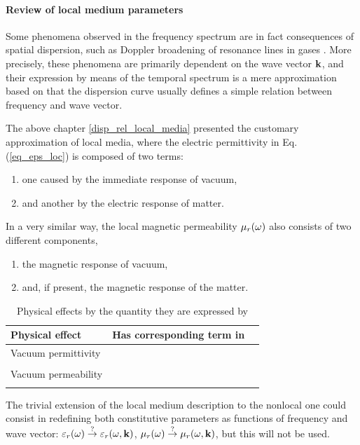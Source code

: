 \paragraph{Review of local medium parameters}%
Some phenomena observed in the frequency spectrum are in fact consequences of spatial dispersion, such as Doppler broadening of resonance lines in gases \cite[p. 359]{landau1984electrodynamics}. More precisely, these phenomena are primarily dependent on the wave vector ${\mathbf{k}}$, and their expression by means of the temporal spectrum is a mere approximation based on that the dispersion curve usually defines a simple relation between  frequency and wave vector. 

The above chapter \ref{disp_rel_local_media} presented the customary approximation of local media, where the electric permittivity in Eq. (\ref{eq_eps_loc}) is composed of two terms: 
\begin{enumerate}
 \item{one caused  by the immediate response of vacuum,} 
 \item{and another by the electric response of matter.}
 \end{enumerate}
In a very similar way, the local magnetic permeability $\mu_r(\omega)$ also consists of two different components, 
\begin{enumerate}[resume]
 \item{the magnetic response of vacuum,} 
 \item{and, if present, the magnetic response of the matter.} 
\end{enumerate}
\begin{table}[ht]   \caption{Physical effects by the quantity they are expressed by}  \label{tb_nonlocaleff} \centering 
\begin{tabular}{lcr}
 \toprule
Physical effect & Has corresponding term in \\
 \hline
Vacuum permittivity &	&	\\
 &	&	\\
Vacuum permeability &	&	\\
 &	&	\\
 \bottomrule
 \end{tabular} \end{table}


The trivial extension of the local medium description to the nonlocal one could consist in redefining both constitutive parameters as functions of frequency and wave vector: $\varepsilon_r(\omega) \stackrel{?}{\rightarrow} \varepsilon_r(\omega, {\mathbf{k}})$, $\mu_r(\omega) \stackrel{?}{\rightarrow} \mu_r(\omega, {\mathbf{k}})$, but this will not be used. 

